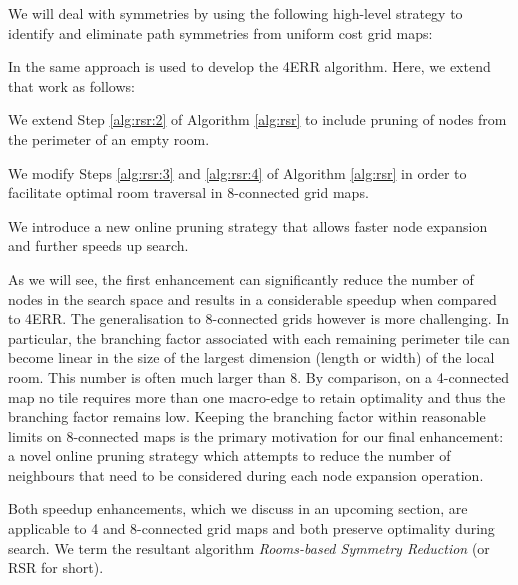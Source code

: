 We will deal with symmetries by using the following high-level strategy to
identify and eliminate path symmetries from uniform cost grid maps:


In \cite{harabor10} the same approach is used to develop the 4ERR algorithm.
Here, we extend that work as follows:
\begin{enumerate}
\item{
We extend Step \ref{alg:rsr:2} of Algorithm \ref{alg:rsr} 
to include pruning of nodes from the perimeter of an empty room.
}
\item{
We modify Steps \ref{alg:rsr:3} and \ref{alg:rsr:4} of Algorithm
\ref{alg:rsr} in order to facilitate optimal room traversal in 8-connected grid
maps. 
\item{We introduce a new online pruning strategy that allows faster node
expansion and further speeds up search.}
}
\end{enumerate}
As we will see, the first enhancement can significantly reduce the number of nodes
in the search space and results in a considerable speedup when compared to 4ERR.
The generalisation to 8-connected grids however is more challenging.
In particular, the branching factor associated with each remaining perimeter tile 
can become linear in the size of the largest dimension (length or width) of the local room. 
This number is often much larger than 8. 
By comparison, on a 4-connected map no tile requires more than one macro-edge 
to retain optimality and thus the branching factor remains low.
Keeping the branching factor within reasonable limits on 8-connected maps
is the primary motivation
for our final enhancement: a novel online pruning strategy which attempts to
reduce the number of neighbours that need to be considered during each node 
expansion operation.
\par
Both speedup enhancements, which we discuss in an upcoming section,
are applicable to 4 and 8-connected grid maps and both preserve optimality
during search.
We term the resultant algorithm \emph{Rooms-based Symmetry Reduction} 
(or RSR for short).
